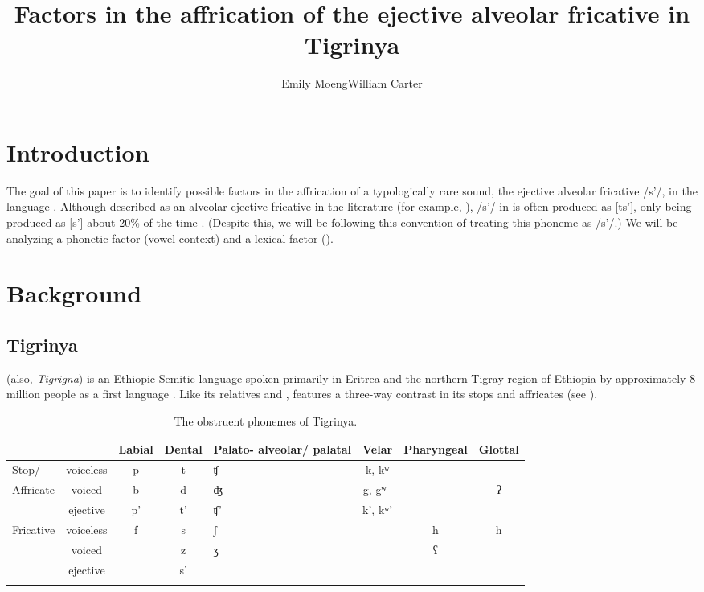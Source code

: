 \documentclass[output=paper,newtxmath,modfonts,nonflat,final]{langsci/langscibook}
\author{Emily Moeng\affiliation{University of North Carolina, Chapel Hill}\lastand William Carter\affiliation{University of North Carolina, Chapel Hill}}
\title{Factors in the affrication of the ejective alveolar fricative in Tigrinya}
\begin{document}
\maketitle
\section{Introduction}\label{sec:moeng:1}

The goal of this paper is to identify possible factors in the affrication of a typologically rare sound, the ejective alveolar fricative /s’/, in the language . Although described as an alveolar ejective fricative in the literature (for example, \citealt{tewolde2002modern}), /s’/ in  is often produced as [ts’], only being produced as [s’] about 20\% of the time \citep{shosted2011affricating}. (Despite this, we will be following this convention of treating this phoneme as /s’/.)  We will be analyzing a phonetic factor (vowel context) and a lexical factor (). 

\section{Background}\label{sec:moeng:2}

\subsection{Tigrinya}\label{sec:moeng:2.1}

 (also, \textit{Tigrigna}) is an Ethiopic-Semitic language spoken primarily in Eritrea and the northern Tigray region of Ethiopia by approximately 8 million people as a first language \citep{lewisetal2016}. Like its relatives  and ,  features a three-way contrast in its stops and affricates (see ).

\begin{table}
\small
\begin{tabularx}{\textwidth}{lccc Q ccc}
\lsptoprule
 &  & Labial & Dental & Palato- alveolar/ palatal& Velar & Pharyngeal & Glottal\\
 \midrule
Stop/& voiceless & p & t & ʧ & k, kʷ &  & \\
Affricate & voiced & b & d & ʤ & g, gʷ~ &  & ʔ\\
 & ejective & p’ & t' & ʧ’ & k', kʷ’ &  & \\
Fricative & voiceless & f & s & ʃ &  & ħ & h\\
 & voiced &  & z & ʒ &  & ʕ & \\
 & ejective &  & s’ &  &  &  & \\
\lspbottomrule
\end{tabularx}
\caption{The obstruent phonemes of Tigrinya.}
\label{tab:moeng:1}
\end{table}
\end{document}

